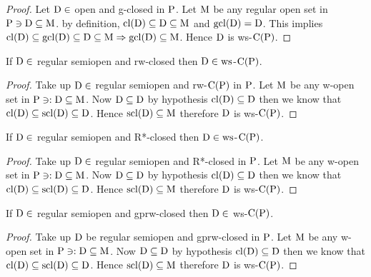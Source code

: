 \begin{proof}
Let $\mathrm{D}\in$ open and g-closed in $\mathrm{P}$. Let $\mathrm{M}$ be any regular open set in $\mathrm{P}\ni \mathrm{D}\subseteq \mathrm{M}$. by definition, $\mathrm{cl}(\mathrm{D})\subseteq \mathrm{D}\subseteq \mathrm{M}$ and $\mathrm{gcl}(\mathrm{D})=\mathrm{D}$. This implies $\mathrm{cl}(\mathrm{D})\subseteq \mathrm{gcl}(\mathrm{D}) \subseteq \mathrm{D}\subseteq \mathrm{M}\Rightarrow\mathrm{gcl}(\mathrm{D})\subseteq \mathrm{M}$. Hence $\mathrm{D}$ is ws-$\mathrm{C}(\mathrm{P})$.
\end{proof}

\begin{thm}\label{thm2.2.44}
If $\mathrm{D}\in$ regular semiopen and rw-closed then $\mathrm{D}\in\mathrm{ws}$-$\mathrm{C}(\mathrm{P})$.
\end{thm}

\begin{proof}
Take up $\mathrm{D}\in$ regular semiopen and rw-$\mathrm{C}(\mathrm{P})$ in $\mathrm{P}$. Let $\mathrm{M}$ be any w-open set in $\mathrm{P}\ni: \mathrm{D}\subseteq \mathrm{M}$. Now $\mathrm{D}\subseteq \mathrm{D}$ by hypothesis $\mathrm{cl}(\mathrm{D})\subseteq \mathrm{D}$ then we know that $\mathrm{cl}(\mathrm{D}) \subseteq \mathrm{scl}(\mathrm{D})\subseteq \mathrm{D}$. Hence $\mathrm{scl}(\mathrm{D})\subseteq \mathrm{M}$ therefore $\mathrm{D}$ is ws-$\mathrm{C}(\mathrm{P})$.
\end{proof}

\begin{thm}\label{thm2.2.45}
If $\mathrm{D}\in$ regular semiopen and R*-closed then $\mathrm{D}\in\mathrm{ws}$-$\mathrm{C}(\mathrm{P})$.
\end{thm}

\begin{proof}
Take up $\mathrm{D}\in$ regular semiopen and R*-closed in $\mathrm{P}$. Let $\mathrm{M}$ be any w-open set in $\mathrm{P} \ni:\mathrm{D}\subseteq \mathrm{M}$. Now $\mathrm{D}\subseteq \mathrm{D}$ by hypothesis $\mathrm{cl}(\mathrm{D})\subseteq \mathrm{D}$ then we know that $\mathrm{cl}(\mathrm{D}) \subseteq \mathrm{scl}(\mathrm{D})\subseteq \mathrm{D}$. Hence $\mathrm{scl}(\mathrm{D})\subseteq \mathrm{M}$ therefore $\mathrm{D}$ is ws-$\mathrm{C}(\mathrm{P})$.
\end{proof}

\begin{thm}\label{thm2.2.46}
If $\mathrm{D}\in$ regular semiopen and gprw-closed then $\mathrm{D}\in$ ws-$\mathrm{C}(\mathrm{P})$.
\end{thm}

\begin{proof}
Take up $\mathrm{D}$ be regular semiopen and gprw-closed in $\mathrm{P}$. Let $\mathrm{M}$ be any w-open set in $\mathrm{P}\ni : \mathrm{D}\subseteq \mathrm{M}$. Now $\mathrm{D}\subseteq \mathrm{D}$ by hypothesis $\mathrm{cl}(\mathrm{D})\subseteq \mathrm{D}$ then we know that $\mathrm{cl}(\mathrm{D}) \subseteq \mathrm{scl}(\mathrm{D})\subseteq \mathrm{D}$. Hence $\mathrm{scl}(\mathrm{D})\subseteq \mathrm{M}$ therefore $\mathrm{D}$ is ws-$\mathrm{C}(\mathrm{P})$.
\end{proof}

